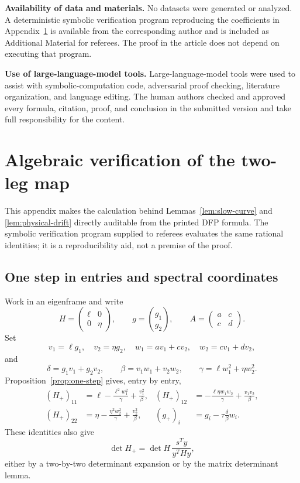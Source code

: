 \documentclass[smallextended,envcountsame]{svjour3}
\begin{document}
\textbf{Availability of data and materials.}
No datasets were generated or analyzed.  A deterministic symbolic
verification program reproducing the coefficients in
Appendix~\ref{app:algebra} is available from the corresponding author and is
included as Additional Material for referees.  The proof in the article does
not depend on executing that program.

\textbf{Use of large-language-model tools.}
Large-language-model tools were used to assist with symbolic-computation
code, adversarial proof checking, literature organization, and language
editing.  The human authors checked and approved every formula, citation,
proof, and conclusion in the submitted version and take full responsibility
for the content.

\appendix

\section{Algebraic verification of the two-leg map}
\label{app:algebra}

This appendix makes the calculation behind Lemmas~\ref{lem:slow-curve} and
\ref{lem:physical-drift} directly auditable from the printed DFP formula.
The symbolic verification program supplied to referees evaluates the same
rational identities; it is a reproducibility aid, not a premise of the proof.

\subsection{One step in entries and spectral coordinates}

Work in an eigenframe and write
\[
H=\begin{pmatrix}\ell&0\\0&\eta\end{pmatrix},\qquad
g=\binom{g_1}{g_2},\qquad
A=\begin{pmatrix}a&c\\c&d\end{pmatrix}.
\]
Set
\[
v_1=\ell g_1,\quad v_2=\eta g_2,\quad
w_1=av_1+cv_2,\quad w_2=cv_1+dv_2,
\]
and
\[
\delta=g_1v_1+g_2v_2,\qquad
\beta=v_1w_1+v_2w_2,
\qquad \gamma=\ell w_1^2+\eta w_2^2.
\]
Proposition~\ref{prop:one-step} gives, entry by entry,
\begin{align}
(H_+)_{11}&=\ell-\frac{\ell^2w_1^2}{\gamma}
                    +\frac{v_1^2}{\beta},
&
(H_+)_{12}&=-\frac{\ell\eta w_1w_2}{\gamma}
                    +\frac{v_1v_2}{\beta},
\label{eq:appendix-H-entries}\\
(H_+)_{22}&=\eta-\frac{\eta^2w_2^2}{\gamma}
                    +\frac{v_2^2}{\beta},
&
(g_+)_i&=g_i-\tau\frac{\delta}{\beta}w_i.
\nonumber
\end{align}
These identities also give
\begin{equation}\label{eq:dfp-determinant}
\det H_+=\det H\,\frac{s^Ty}{y^THy},
\end{equation}
either by a two-by-two determinant expansion or by the matrix determinant
lemma.
\end{document}
